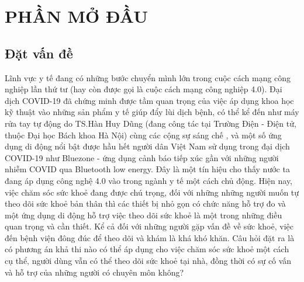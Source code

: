 
\section*{PHẦN MỞ ĐẦU}
\subsection*{Đặt vấn đề}

Lĩnh vực y tế đang có những bước chuyển mình lớn trong cuộc cách mạng công nghiệp lần thứ tư 
(hay còn được gọi là cuộc cách mạng công nghiệp 4.0). Đại dịch COVID-19 đã chứng minh được tầm quan trọng của việc áp dụng
khoa học kỹ thuật vào những sản phẩm y tế giúp đẩy lùi dịch bệnh,
có thể kể đến như máy rửa tay tự động do TS.Hàn Huy Dũng (đang công tác tại Trường Điện - Điện tử, thuộc Đại học Bách khoa Hà Nội) 
cùng các cộng sự sáng chế \cite{ref_thay_dzung}, và một số ứng dụng di động
nổi bật được hầu hết người dân Việt Nam sử dụng trong đại dịch COVID-19 như Bluezone - ứng dụng cảnh báo tiếp xúc gần với
những người nhiễm COVID qua Bluetooth low energy. Đây là một tín hiệu cho thấy nước ta đang áp
dụng công nghệ 4.0 vào trong ngành y tế một cách chủ động. Hiện nay, việc chăm sóc sức khoẻ đang được chú trọng, đối với 
những những người muốn tự theo dõi sức khoẻ bản thân
thì các thiết bị nhỏ gọn có chức năng hỗ trợ đo và một ứng dụng di động hỗ trợ việc theo dõi sức khoẻ là một trong những
điều quan trọng và cần thiết. Kể cả đối với những người gặp vấn đề về sức khoẻ, việc đến bệnh viện đông đúc để theo dõi
và khám là khá khó khăn. Câu hỏi đặt ra là có phương án khả thi nào có thể áp dụng cho việc chăm sóc sức khoẻ một cách cụ thể, 
người dùng vẫn có thể theo dõi sức khoẻ tại nhà, đồng thời có sự cố vấn và hỗ trợ của những người có chuyên môn không?


